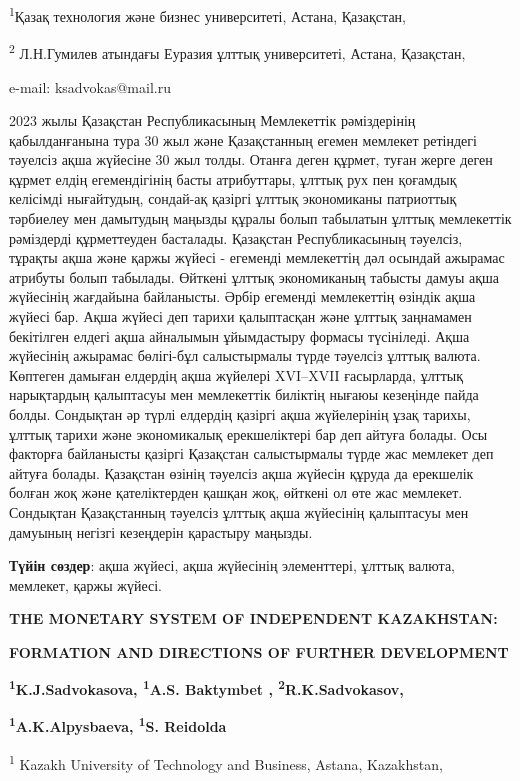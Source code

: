\textsuperscript{1}Қазақ технология және бизнес университеті, Астана,
Қазақстан,

\textsuperscript{2} Л.Н.Гумилев атындағы Еуразия ұлттық университеті,
Астана, Қазақстан,

e-mail: ksadvokas@mail.ru

2023 жылы Қазақстан Республикасының Мемлекеттік рәміздерінің
қабылданғанына тура 30 жыл және Қазақстанның егемен мемлекет ретіндегі
тәуелсіз ақша жүйесіне 30 жыл толды. Отанға деген құрмет, туған жерге
деген құрмет елдің егемендігінің басты атрибуттары, ұлттық рух пен
қоғамдық келісімді нығайтудың, сондай-ақ қазіргі ұлттық экономиканы
патриоттық тәрбиелеу мен дамытудың маңызды құралы болып табылатын ұлттық
мемлекеттік рәміздерді құрметтеуден басталады. Қазақстан Республикасының
тәуелсіз, тұрақты ақша және қаржы жүйесі - егеменді мемлекеттің дәл
осындай ажырамас атрибуты болып табылады. Өйткені ұлттық экономиканың
табысты дамуы ақша жүйесінің жағдайына байланысты. Әрбір егеменді
мемлекеттің өзіндік ақша жүйесі бар. Ақша жүйесі деп тарихи қалыптасқан
және ұлттық заңнамамен бекітілген елдегі ақша айналымын ұйымдастыру
формасы түсініледі. Ақша жүйесінің ажырамас бөлігі-бұл салыстырмалы
түрде тәуелсіз ұлттық валюта. Көптеген дамыған елдердің ақша жүйелері
XVI--XVII ғасырларда, ұлттық нарықтардың қалыптасуы мен мемлекеттік
биліктің нығаюы кезеңінде пайда болды. Сондықтан әр түрлі елдердің
қазіргі ақша жүйелерінің ұзақ тарихы, ұлттық тарихи және экономикалық
ерекшеліктері бар деп айтуға болады. Осы факторға байланысты қазіргі
Қазақстан салыстырмалы түрде жас мемлекет деп айтуға болады. Қазақстан
өзінің тәуелсіз ақша жүйесін құруда да ерекшелік болған жоқ және
қателіктерден қашқан жоқ, өйткені ол өте жас мемлекет. Сондықтан
Қазақстанның тәуелсіз ұлттық ақша жүйесінің қалыптасуы мен дамуының
негізгі кезеңдерін қарастыру маңызды.

{\bfseries Түйін сөздер}: ақша жүйесі, ақша жүйесінің элементтері, ұлттық
валюта, мемлекет, қаржы жүйесі.

{\bfseries THE MONETARY SYSTEM OF INDEPENDENT KAZAKHSTAN:}

{\bfseries FORMATION AND DIRECTIONS OF FURTHER DEVELOPMENT}

{\bfseries \textsuperscript{1}K.J.Sadvokasova, \textsuperscript{1}A.S.
Baktymbet , \textsuperscript{2}R.K.Sadvokasov,}

{\bfseries \textsuperscript{1}A.K.Alpysbaeva, \textsuperscript{1}S.
Reidolda}

\textsuperscript{1} Kazakh University of Technology and Business,
Astana, Kazakhstan,

